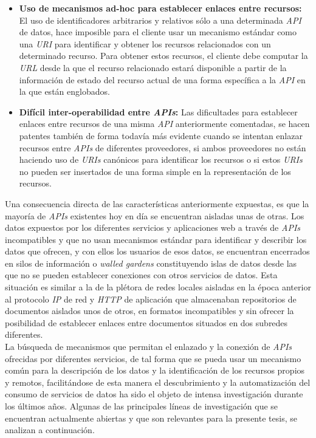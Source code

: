 \begin{itemize}
\item \textbf{Uso de mecanismos ad-hoc para establecer enlaces entre recursos:} El uso de identificadores arbitrarios y relativos s\'olo a una determinada \textit{API} de datos, hace imposible para el cliente usar un mecanismo est\'andar como una \textit{URI} para identificar y obtener los recursos relacionados con un determinado recurso. Para obtener estos recursos, el cliente debe computar la \textit{URL} desde la que el recurso relacionado estar\'a disponible a partir de la informaci\'on de estado del recurso actual de una forma espec\'ifica a la \textit{API} en la que est\'an englobados.

\item \textbf{Dif\'icil inter-operabilidad entre \textit{APIs}:} Las dificultades para establecer enlaces entre recursos de una misma \textit{API} anteriormente comentadas, se hacen patentes tambi\'en de forma todav\'ia m\'as evidente cuando se intentan enlazar recursos entre \textit{APIs} de diferentes proveedores, si ambos proveedores no est\'an haciendo uso de \textit{URIs} can\'onicos para identificar los recursos o si estos \textit{URIs} no pueden ser insertados de una forma simple en la representaci\'on de los recursos.

\end{itemize}

Una consecuencia directa de las caracter\'isticas anteriormente expuestas, es que la mayor\'ia de \textit{APIs} existentes hoy en d\'ia se encuentran aisladas unas de otras. Los datos expuestos por los diferentes servicios y aplicaciones web a trav\'es de \textit{APIs} incompatibles y que no usan mecanismos est\'andar para identificar y describir los datos que ofrecen, y con ellos los usuarios de esos datos, se encuentran encerrados en silos de informaci\'on o \textit{walled gardens} \cite{halpin2008beyond} constituyendo islas de datos desde las que no se pueden establecer conexiones con otros servicios de datos. Esta situaci\'on es similar a la de la pl\'etora de redes locales aisladas en la \'epoca anterior al protocolo \textit{IP} de red y \textit{HTTP} de aplicaci\'on que almacenaban repositorios de documentos aislados unos de otros, en formatos incompatibles y sin ofrecer la posibilidad de establecer enlaces entre documentos situados en dos subredes diferentes.\\
La b\'usqueda de mecanismos que permitan el enlazado y la conexi\'on de \textit{APIs} ofrecidas por diferentes servicios, de tal forma que se pueda usar un mecanismo com\'un para la descripci\'on de los datos y la identificaci\'on de los recursos propios y remotos, facilit\'andose de esta manera el descubrimiento y la automatizaci\'on del consumo de servicios de datos ha sido el objeto de intensa investigaci\'on durante los \'ultimos a\~nos.
Algunas de las principales l\'ineas de investigaci\'on que se encuentran actualmente abiertas y que son relevantes para la presente tesis, se analizan a continuaci\'on.

